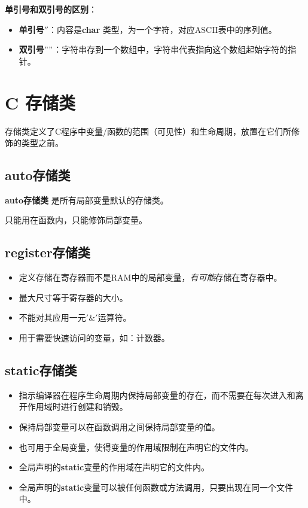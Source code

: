 \documentclass[UTF8]{ctexart}
\begin{document}
\begin{framed}
		\textbf{单引号和双引号的区别}：
		\begin{itemize}
			\item \textbf{单引号$''$}：内容是\textbf{char} 类型，为一个字符，对应ASCII表中的序列值。
			\item \textbf{双引号$""$}：字符串存到一个数组中，字符串代表指向这个数组起始字符的指针。
		\end{itemize}
	\end{framed} 

	\clearpage
	\section{C 存储类}
	存储类定义了C程序中变量/函数的范围（可见性）和生命周期，放置在它们所修饰的类型之前。
	\subsection{auto存储类}
	\textbf{auto存储类} 是所有局部变量默认的存储类。
	
	只能用在函数内，只能修饰局部变量。
	\subsection{register存储类}
	\begin{itemize}
		\item 定义存储在寄存器而不是RAM中的局部变量，\emph{有可能}存储在寄存器中。
		\item 最大尺寸等于寄存器的大小。
		\item 不能对其应用一元$'\&'$运算符。
		\item 用于需要快速访问的变量，如：计数器。
	\end{itemize}
	\subsection{static存储类}
	\begin{itemize}
		\item 指示编译器在程序生命周期内保持局部变量的存在，而不需要在每次进入和离开作用域时进行创建和销毁。
		\item 保持局部变量可以在函数调用之间保持局部变量的值。
		\item 也可用于全局变量，使得变量的作用域限制在声明它的文件内。
		\item 全局声明的\textbf{static}变量的作用域在声明它的文件内。
		\item 全局声明的\textbf{static}变量可以被任何函数或方法调用，只要出现在同一个文件中。
	\end{itemize}
\end{document}
